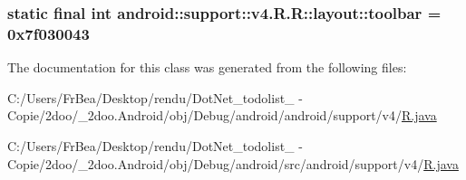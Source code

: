 \hypertarget{classandroid_1_1support_1_1v4_1_1_r_1_1layout_daf41ba8ff563acdb593a5c485284069}{
\subsubsection[{toolbar}]{\setlength{\rightskip}{0pt plus 5cm}static final int android::support::v4.R.R::layout::toolbar = 0x7f030043}}
\label{classandroid_1_1support_1_1v4_1_1_r_1_1layout_daf41ba8ff563acdb593a5c485284069}




The documentation for this class was generated from the following files:\begin{CompactItemize}
\item 
C:/Users/FrBea/Desktop/rendu/DotNet\_\-todolist\_ - Copie/2doo/\_\-2doo.Android/obj/Debug/android/android/support/v4/\hyperlink{android_2support_2v4_2_r_8java}{R.java}\item 
C:/Users/FrBea/Desktop/rendu/DotNet\_\-todolist\_ - Copie/2doo/\_\-2doo.Android/obj/Debug/android/src/android/support/v4/\hyperlink{src_2android_2support_2v4_2_r_8java}{R.java}\end{CompactItemize}
